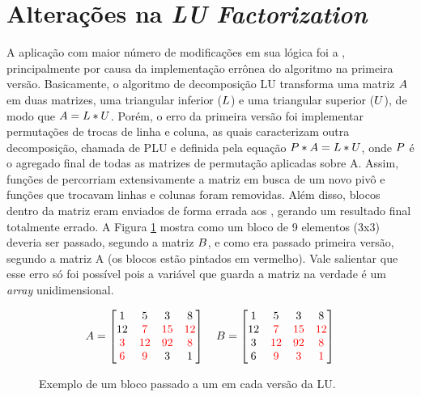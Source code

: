 \section{Alterações na \textit{LU Factorization}}
\label{sec:alteracoeslu}

A aplicação com maior número de modificações em sua lógica foi a \textit{\LU}, principalmente por causa da implementação errônea do algoritmo na primeira versão. Basicamente, o algoritmo de decomposição LU transforma uma matriz $\mathnormal{A}$ em duas matrizes, uma triangular inferior ($\mathnormal{L}$) e uma triangular superior ($\mathnormal{U}$), de modo que $\mathnormal{A = L * U}$. Porém, o erro da primeira versão foi implementar permutações de trocas de linha e coluna, as quais caracterizam outra decomposição, chamada de PLU e definida pela equação $\mathnormal{P * A = L * U}$, onde $\mathnormal{P}$ é o agregado final de todas as matrizes de permutação aplicadas sobre A. Assim, funções de percorriam extensivamente a matriz em busca de um novo pivô e funções que trocavam linhas e colunas foram removidas. Além disso, blocos dentro da matriz eram enviados de forma errada aos \slaves, gerando um resultado final totalmente errado. A Figura \ref{fig:rightandwrongblocks} mostra como um bloco de 9 elementos (3x3) deveria ser passado, segundo a matriz $\mathnormal{B}$, e como era passado primeira versão, segundo a matriz {A} (os blocos estão pintados em vermelho). Vale salientar que esse erro só foi possível pois a variável que guarda a matriz na verdade é um \textit{array} unidimensional.

\begin{figure}[h]
  \centering
  \caption{Exemplo de um bloco passado a um \slave em cada versão da LU.}
  \label{fig:rightandwrongblocks}
  \[
    A=
    \begin{bmatrix}
      1  & 5  & 3  & 8  \\
      12 & \color{red} 7  & \color{red} 15 & \color{red} 12 \\
      \color{red}  3  & \color{red}  12 & \color{red}  92 & \color{red} 8 \\
      \color{red}  6  & \color{red}  9  & 3  & 1 
    \end{bmatrix}\quad
    B=
    \begin{bmatrix}
      1  & 5  & 3  & 8  \\
      12 & \color{red} 7  & \color{red} 15 & \color{red} 12 \\
      3  & \color{red} 12 & \color{red} 92 & \color{red} 8 \\
      6  & \color{red} 9  & \color{red} 3  & \color{red} 1 
    \end{bmatrix}
  \]
\end{figure}


